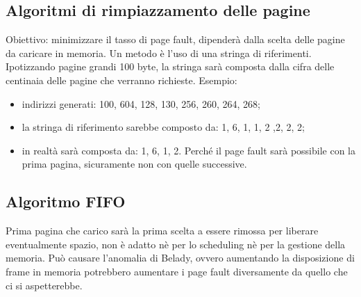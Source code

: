 \documentclass[a4paper, 12pt]{book}
\begin{document}
\subsection{Algoritmi di rimpiazzamento delle pagine}

Obiettivo: minimizzare il tasso di page fault, dipenderà dalla scelta delle pagine da caricare in memoria. Un metodo è l'uso 
di una stringa di riferimenti. Ipotizzando pagine grandi 100 byte, la stringa sarà composta dalla cifra delle centinaia delle 
pagine che verranno richieste. Esempio: 

\begin{itemize}
    \item indirizzi generati: 100, 604, 128, 130, 256, 260, 264, 268;
    \item la stringa di riferimento sarebbe composto da: 1, 6, 1, 1, 2 ,2, 2, 2;
    \item in realtà sarà composta da: 1, 6, 1, 2. Perché il page fault sarà possibile con la prima pagina, sicuramente non con quelle successive.
\end{itemize}

\subsection{Algoritmo FIFO}

Prima pagina che carico sarà la prima scelta a essere rimossa per liberare  eventualmente spazio, non è adatto nè per lo scheduling 
nè per la gestione della memoria. Può causare l'anomalia di Belady, ovvero aumentando la disposizione di frame in memoria potrebbero 
aumentare i page fault diversamente da quello che ci si aspetterebbe.

\begin{figure}[h!]
    \centering
    \quad
\end{figure}
\end{document}
